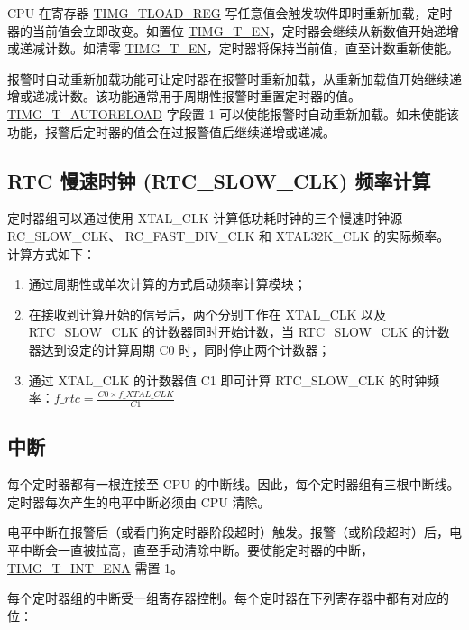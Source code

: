 \documentclass[main\_\_CN.tex]{subfiles}
\begin{document}
CPU 在寄存器 \hyperref[regdesc:TIMGTXLOADREG]{TIMG\_TLOAD\_REG} 写任意值会触发软件即时重新加载，定时器的当前值会立即改变。如置位 \hyperref[fielddesc:TIMGTXEN]{TIMG\_T\_EN}，定时器会继续从新数值开始递增或递减计数。如清零 \hyperref[fielddesc:TIMGTXEN]{TIMG\_T\_EN}，定时器将保持当前值，直至计数重新使能。

报警时自动重新加载功能可让定时器在报警时重新加载，从重新加载值开始继续递增或递减计数。该功能通常用于周期性报警时重置定时器的值。\hyperref[fielddesc:TIMGTXAUTORELOAD]{TIMG\_T\_AUTORELOAD} 字段置 1 可以使能报警时自动重新加载。如未使能该功能，报警后定时器的值会在过报警值后继续递增或递减。

\subsection{RTC 慢速时钟 (RTC\_SLOW\_CLK) 频率计算}
定时器组可以通过使用 XTAL\_CLK 计算低功耗时钟的三个慢速时钟源 RC\_SLOW\_CLK、 RC\_FAST\_DIV\_CLK 和 XTAL32K\_CLK 的实际频率。计算方式如下：
\begin{enumerate}
    \item 通过周期性或单次计算的方式启动频率计算模块；
    \item 在接收到计算开始的信号后，两个分别工作在 XTAL\_CLK 以及 RTC\_SLOW\_CLK 的计数器同时开始计数，当 RTC\_SLOW\_CLK 的计数器达到设定的计算周期 C0 时，同时停止两个计数器；
    \item 通过 XTAL\_CLK 的计数器值 C1 即可计算 RTC\_SLOW\_CLK 的时钟频率：$f\_rtc = \frac{C0 \times f\_XTAL\_CLK}{C1}$
\end{enumerate}

\subsection{中断}\label{sec:timg-interrupt}
每个定时器都有一根连接至 CPU 的中断线。因此，每个定时器组有三根中断线。定时器每次产生的电平中断必须由 CPU 清除。

电平中断在报警后（或看门狗定时器阶段超时）触发。报警（或阶段超时）后，电平中断会一直被拉高，直至手动清除中断。要使能定时器的中断，\hyperref[regdesc:TIMGINTENATIMERSREG]{TIMG\_T\_INT\_ENA} 需置 1。

每个定时器组的中断受一组寄存器控制。每个定时器在下列寄存器中都有对应的位：
\end{document}
